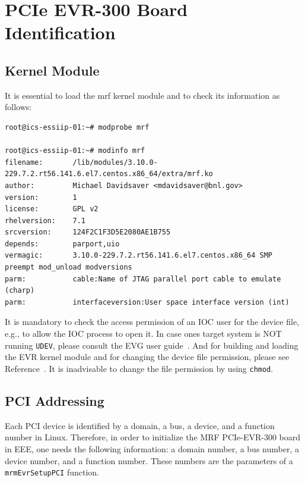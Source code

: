 \documentclass[11pt
  , a4paper
  , article
  , oneside
  , showtrims
]{memoir}
\begin{document}
\section{PCIe EVR-300 Board Identification}
         
\subsection{Kernel Module}
It is essential to load the mrf kernel module and to check its information as follows:
\begin{lstlisting}[style=termstyle]
root@ics-essiip-01:~# modprobe mrf
  
root@ics-essiip-01:~# modinfo mrf
filename:       /lib/modules/3.10.0-229.7.2.rt56.141.6.el7.centos.x86_64/extra/mrf.ko
author:         Michael Davidsaver <mdavidsaver@bnl.gov>
version:        1
license:        GPL v2
rhelversion:    7.1
srcversion:     124F2C1F3D5E2080AE1B755
depends:        parport,uio
vermagic:       3.10.0-229.7.2.rt56.141.6.el7.centos.x86_64 SMP preempt mod_unload modversions 
parm:           cable:Name of JTAG parallel port cable to emulate (charp)
parm:           interfaceversion:User space interface version (int)
\end{lstlisting}

It is mandatory to check the access permission of an IOC user for the device file, e.g.,  to allow the IOC process to open it. In case ones target system is NOT running \texttt{UDEV}, please consult the EVG user guide~\cite{EVR-USER-GUIDE}. And for building and loading the EVR kernel module and for changing the device file permission, please see Reference~\citep[see][p12,13]{EVR-USER-GUIDE}. It is inadvisable to change the file permission by using \texttt{chmod}. 

\subsection{PCI Addressing}
Each PCI device is identified by a domain, a bus, a device, and a function number in Linux. Therefore, in order to initialize the MRF PCIe-EVR-300 board in EEE, one needs the following information: a domain number, a bus number, a device number, and a function number. These numbers are the parameters of a \texttt{mrmEvrSetupPCI} function.
\end{document}

